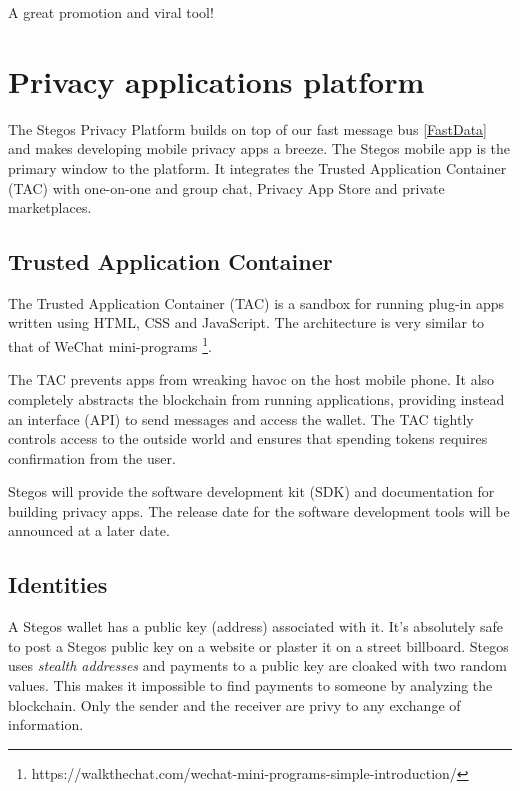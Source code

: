 \documentclass[a4paper, 10pt, conference]{ieeeconf}
\begin{document}
A great promotion and viral tool!

\section{Privacy applications platform}\label{PrivacyPlatform}

The Stegos Privacy Platform builds on top of our fast message bus \ref{FastData} and makes developing mobile privacy apps a breeze. The Stegos mobile app is the primary window to the platform. It integrates the Trusted Application Container (TAC) with one-on-one and group chat, Privacy App Store and private marketplaces. 

\subsection{Trusted Application Container}\label{TAC}
The Trusted Application Container (TAC) is a sandbox for running plug-in apps written using HTML, CSS and JavaScript. The architecture is very similar to that of WeChat mini-programs \footnote{https://walkthechat.com/wechat-mini-programs-simple-introduction/}.

The TAC prevents apps from wreaking havoc on the host mobile phone. It also completely abstracts the blockchain from running applications, providing instead an interface (API) to send messages and access the wallet. The TAC tightly controls access to the outside world and ensures that spending tokens requires confirmation from the user. 


Stegos will provide the software development kit (SDK) and documentation for building privacy apps. The release date for the software development tools will be announced at a later date.

\subsection{Identities}\label{Identities}
A Stegos wallet has a public key (address) associated with it. It's absolutely safe to post a Stegos public key on a website or plaster it on a street billboard. Stegos uses \textit{stealth addresses} and payments to a public key are cloaked with two random values. This makes it impossible to find payments to someone by analyzing the blockchain. Only the sender and the receiver are privy to any exchange of information. 
\end{document}
